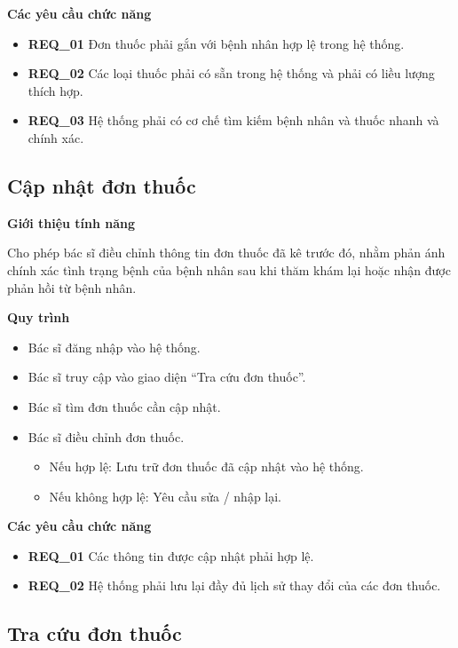 \noindent \textbf{Các yêu cầu chức năng}
\begin{itemize}
  \item \textbf{REQ\_01} Đơn thuốc phải gắn với bệnh nhân hợp lệ trong hệ thống.
  \item \textbf{REQ\_02} Các loại thuốc phải có sẵn trong hệ thống và phải có liều lượng thích hợp.
  \item \textbf{REQ\_03} Hệ thống phải có cơ chế tìm kiếm bệnh nhân và thuốc nhanh và chính xác.
\end{itemize}

\subsection{Cập nhật đơn thuốc}

\noindent \textbf{Giới thiệu tính năng}

Cho phép bác sĩ điều chỉnh thông tin đơn thuốc đã kê trước đó, nhằm phản ánh chính xác tình trạng bệnh của bệnh nhân sau khi thăm khám lại hoặc nhận được phản hồi từ bệnh nhân.

\noindent \textbf{Quy trình}
\begin{itemize}
  \item Bác sĩ đăng nhập vào hệ thống.
  \item Bác sĩ truy cập vào giao diện ``Tra cứu đơn thuốc''.
  \item Bác sĩ tìm đơn thuốc cần cập nhật.
  \item Bác sĩ điều chỉnh đơn thuốc.
    \begin{itemize}
      \item Nếu hợp lệ: Lưu trữ đơn thuốc đã cập nhật vào hệ thống.
      \item Nếu không hợp lệ: Yêu cầu sửa / nhập lại.
    \end{itemize}
\end{itemize}

\noindent \textbf{Các yêu cầu chức năng}
\begin{itemize}
  \item \textbf{REQ\_01} Các thông tin được cập nhật phải hợp lệ.
  \item \textbf{REQ\_02} Hệ thống phải lưu lại đầy đủ lịch sử thay đổi của các đơn thuốc.
\end{itemize}

\subsection{Tra cứu đơn thuốc}

